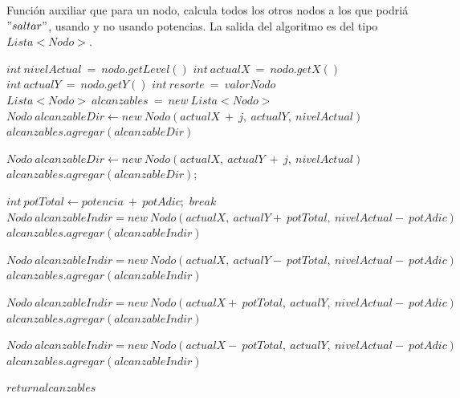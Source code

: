 Funci\'on auxiliar que para un nodo, calcula todos los otros nodos a los que podri\'a $"saltar"$, usando y no usando potencias. La salida del algoritmo es del tipo $Lista<Nodo>$.
\vspace{2mm}
\begin{algorithmic}[1]
		\State $int\: nivelActual\: =\: nodo.getLevel()$
		\State $int\: actualX\: =\: nodo.getX()$
		\State $int\: actualY\: =\: nodo.getY()$
		\State $int\: resorte\: =\: valorNodo$
		\State $Lista<Nodo>\: alcanzables\: =\: new\: Lista<Nodo>$
				\State $Nodo\: alcanzableDir\gets new\: Nodo(actualX\: +\: j,\: actualY, \:nivelActual)$
				\State $alcanzables.agregar(alcanzableDir)$
			\EndIf
				
				\State $Nodo\: alcanzableDir \gets new \:Nodo(actualX, \:actualY\: + \:j, \:nivelActual)$
				\State $alcanzables.agregar(alcanzableDir);$
			\EndIf
		\EndFor

			\State $int\: potTotal \gets potencia\: +\: potAdic; $
				\State $break$
			\EndIf
				\State $Nodo\: alcanzableIndir = new\: Nodo(actualX,\: actualY +\: potTotal, \:nivelActual - \:potAdic)$
				\State $alcanzables.agregar(alcanzableIndir)$
			\EndIf

				\State $Nodo\: alcanzableIndir = new\: Nodo(actualX,\: actualY -\: potTotal, \:nivelActual - \:potAdic)$
				\State $alcanzables.agregar(alcanzableIndir)$
			\EndIf

				\State $Nodo\: alcanzableIndir = new\: Nodo(actualX  +\: potTotal,\: actualY, \:nivelActual - \:potAdic)$
				\State $alcanzables.agregar(alcanzableIndir)$
			\EndIf

				\State $Nodo\: alcanzableIndir = new\: Nodo(actualX  -\: potTotal,\: actualY, \:nivelActual - \:potAdic)$
				\State $alcanzables.agregar(alcanzableIndir)$
			\EndIf

		\EndFor	
		\State $return alcanzables$
\vspace{2mm}
\EndProcedure
\end{algorithmic}

